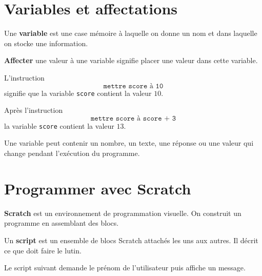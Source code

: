 \documentclass[a4paper,10pt]{report}
\begin{document}
\section{Variables et affectations}

\begin{defn}
Une \textbf{variable} est une case mémoire à laquelle on donne un nom et dans laquelle on stocke une information.
\end{defn}

\begin{defn}
\textbf{Affecter} une valeur à une variable signifie placer une valeur dans cette variable.
\end{defn}

\begin{exemple}
L'instruction
\[
\texttt{mettre score à 10}
\]
signifie que la variable \texttt{score} contient la valeur $10$.

\medskip
Après l'instruction
\[
\texttt{mettre score à score + 3}
\]
la variable \texttt{score} contient la valeur $13$.
\end{exemple}

\begin{rem}
Une variable peut contenir un nombre, un texte, une réponse ou une valeur qui change pendant l'exécution du programme.
\end{rem}

\section{Programmer avec Scratch}

\begin{defn}
\textbf{Scratch} est un environnement de programmation visuelle. On construit un programme en assemblant des blocs.
\end{defn}

\begin{defn}
Un \textbf{script} est un ensemble de blocs Scratch attachés les uns aux autres. Il décrit ce que doit faire le lutin.
\end{defn}

\begin{exemple}
Le script suivant demande le prénom de l'utilisateur puis affiche un message.

\begin{center}
\begin{scratch}
\end{scratch}
\end{center}
\end{exemple}
\end{document}
